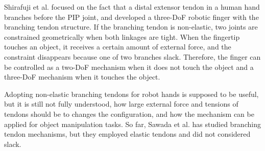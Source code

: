 \documentclass{llncs}
\begin{document}
Shirafuji et al. focused on the fact that a distal extensor tendon in a human hand
branches before the PIP joint,
and developed a three-DoF robotic finger with the branching tendon structure\cite{Shirafuji2014b}.
If the branching tendon is non-elastic,
two joints are constrained geometrically when both linkages are tight.
When the fingertip touches an object,
it receives a certain amount of external force, and the constraint disappears because one of two branches slack.
Therefore, the finger can be controlled as a two-DoF mechanism when it does not touch the object
and a three-DoF mechanism when it touches the object.

Adopting non-elastic branching tendons for robot hands
is supposed to be useful, but it is still not fully understood,
how large external force and tensions of tendons should be to changes the configuration,
and how the mechanism can be applied for object manipulation tasks.
So far, Sawada et al. has studied branching tendon mechanisms,
but they employed elastic tendons and did not considered slack.
\end{document}
